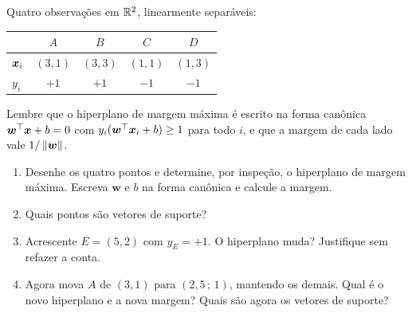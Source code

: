 \documentclass[11pt,a4paper]{article}
\begin{document}

\begin{exercicio}
Quatro observações em $\mathbb{R}^2$, linearmente separáveis:
\begin{center}\small
\renewcommand{\arraystretch}{1.2}
\begin{tabular}{@{}lcccc@{}}
\toprule
        & $A$ & $B$ & $C$ & $D$ \\
\midrule
$\bm{x}_i$  & $(3,1)$ & $(3,3)$ & $(1,1)$ & $(1,3)$ \\
$y_i$   & $+1$ & $+1$ & $-1$ & $-1$ \\
\bottomrule
\end{tabular}
\end{center}
Lembre que o hiperplano de margem máxima é escrito na forma canônica
$\bm w^\top\bm{x} + b = 0$ com $y_i(\bm w^\top\bm{x}_i+b)\ge 1$ para todo $i$, e que a
margem de cada lado vale $1/\left\lVert \bm w \right\rVert$.
\begin{enumerate}[label=(\alph*),leftmargin=1.1cm]
  \item Desenhe os quatro pontos e determine, por inspeção, o hiperplano de
        margem máxima. Escreva $\bm w$ e $b$ na forma canônica e calcule a margem.
  \item Quais pontos são vetores de suporte?
  \item Acrescente $E=(5,2)$ com $y_E=+1$. O hiperplano muda? Justifique sem
        refazer a conta.
  \item Agora mova $A$ de $(3,1)$ para $(2{,}5\,;\,1)$, mantendo os demais. Qual
        é o novo hiperplano e a nova margem? Quais são agora os vetores de
        suporte?
\end{enumerate}
\end{exercicio}
\end{document}
